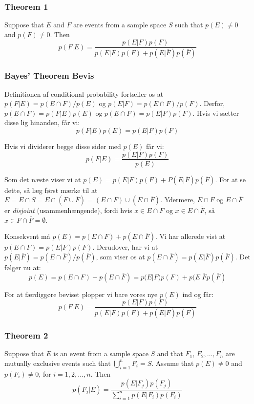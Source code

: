 \documentclass{beamer}
\begin{document}
\begin{frame}
  \frametitle{Theorem 1}
  \begin{theorem}
    Suppose that $E$ and $F$ are events from a sample space $S$ such that $p(E) \neq 0$ and $p(F) \neq 0$. Then
    \[ p(F|E) = \frac{p(E|F)p(F)}{p(E|F)p(F)+p(E|\overline{F})p(\overline{F})} \]
  \end{theorem} 
\end{frame}

\begin{frame}[allowframebreaks]
  \frametitle{Bayes' Theorem Bevis}
  Definitionen af conditional probability fortæller os at $p(F|E) = p(E \cap F)/p(E)$ og $p(E|F) = p(E \cap F)/p(F)$. Derfor, $p(E \cap F) = p(F|E)p(E)$ og $p(E \cap F) = p(E|F)p(F)$. Hvis vi sætter disse lig hinanden, får vi:
  \[ p(F|E)p(E) = p(E|F)p(F)  \]

  Hvis vi dividerer begge disse sider med $p(E)$ får vi:
  \[ p(F|E) = \frac{p(E|F)p(F)}{p(E)} \]

  Som det næste viser vi at $p(E) = p(E|F)p(F)+P(E|\overline{F})p(\overline{F})$. For at se dette, så læg først mærke til at $E = E \cap S = E \cap (F \cup \overline{F}) = (E \cap F) \cup ( E \cap \overline{F})$. Ydermere, $E \cap F$ og $E \cap \overline{F}$ er \textit{disjoint} (usammenhængende), fordi hvis $x \in E \cap F$ og $x \in E \cap \overline{F}$, så $x \in F \cap \overline{F} = \emptyset$.

  Konsekvent må $p(E) = p(E \cap F) + p(E \cap \overline{F})$. Vi har allerede vist at $p(E \cap F) = p(E |F) p(F)$. Derudover, har vi at $p(E | \overline{F}) = p(E \cap \overline{F})/p(\overline{F})$, som viser os at $p(E \cap \overline{F}) = p(E|\overline{F})p(\overline{F})$. Det følger nu at:
  \[ p(E) = p(E \cap F) + p(E \cap \overline{F}) = p(E |F) p(F) + p(E | \overline{F} p(\overline{F}) \]

  For at færdiggøre beviset plopper vi bare vores nye $p(E)$ ind og får:
  \[ p(F|E) = \frac{p(E|F)p(F)}{p(E|F)p(F)+p(E|\overline{F})p(\overline{F})} \]
\end{frame}

\begin{frame}
  \frametitle{Theorem 2}
  \begin{theorem}
    Suppose that $E$ is an event from a sample space $S$ and that $F_{1}$, $F_{2}, \ldots, F_{n}$ are mutually exclusive events such that $\bigcup\limits_{i=1}^{n}F_{i}=S$. Assume that $p(E) \neq 0$ and $p(F_{i}) \neq 0$, for $i = 1, 2, \ldots, n$. Then
    \[ p(F_{j}|E) = \frac{p(E|F_{j}) p(F_{j})}{\sum_{i=1}^{n}p(E|F_{i})p(F_{i})} \]
  \end{theorem}
\end{frame}
\end{document}
